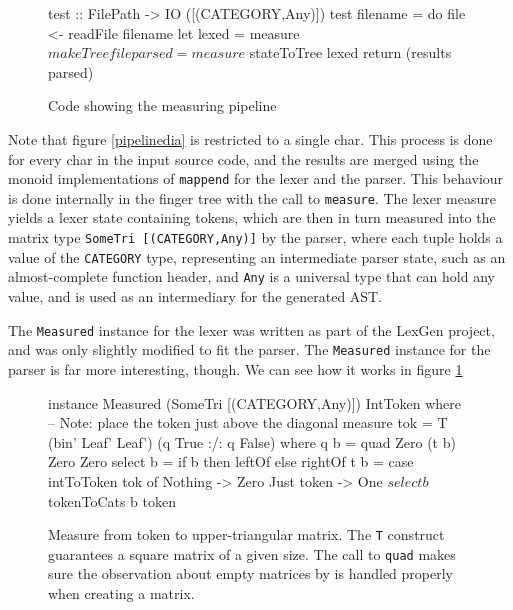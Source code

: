 \documentclass[a4paper,12pt,twosided]{report}
\begin{document}
\begin{figure}[H]
\begin{code}
test :: FilePath -> IO ([(CATEGORY,Any)])
test filename = do
    file <- readFile filename
    let lexed  = measure $ makeTree file
        parsed = measure $ stateToTree lexed
    return (results parsed)
\end{code} 
\caption{Code showing the measuring pipeline}
\end{figure}

Note that figure \ref{pipelinedia} is restricted to a single char. This process
is done for every char in the input source code, and the results are merged
using the monoid implementations of \texttt{mappend} for the lexer and the
parser. This behaviour is done internally in the finger tree with the call to
\texttt{measure}.  The lexer measure yields a lexer state containing tokens,
which are then in turn measured into the matrix type \texttt{SomeTri
[(CATEGORY,Any)]} by the parser, where each tuple holds a value of the
\texttt{CATEGORY} type, representing an intermediate parser state, such as an
almost-complete function header, and \texttt{Any} is a universal type that can
hold any value, and is used as an intermediary for the generated AST. 

The \texttt{Measured} instance for the lexer was written as part of the LexGen
project, and was only slightly modified to fit the parser. The \texttt{Measured}
instance for the parser is far more interesting, though. We can see how it works
in figure \ref{parsemeasure}

\begin{figure}[H]
\begin{code}
instance Measured (SomeTri [(CATEGORY,Any)]) IntToken where
    -- Note: place the token just above the diagonal
    measure tok = T (bin' Leaf' Leaf') (q True :/: q False)
      where q b = quad Zero (t b) Zero Zero
            select b = if b then leftOf else rightOf
            t b = case intToToken tok of
                Nothing    -> Zero
                Just token -> One $ select b $ tokenToCats b token

\end{code}
\caption{\label{parsemeasure} Measure from token to upper-triangular matrix. The
\texttt{T} construct guarantees a square matrix of a given size. The call to
\texttt{quad} makes sure the observation about empty matrices by
\citeauthor{parparsepaper} is handled properly when creating a matrix.}
\end{figure}
\end{document}
